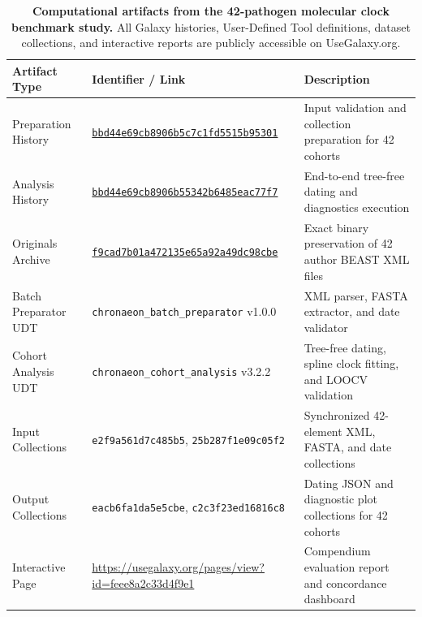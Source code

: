 \documentclass[11pt,letterpaper]{article}
\begin{document}
\begin{table}[!htbp]
\centering
\small
\begin{tabularx}{\textwidth}{llX}
\toprule
\textbf{Artifact Type} & \textbf{Identifier / Link} & \textbf{Description} \\
\midrule
Preparation History & \href{https://usegalaxy.org/histories/view?id=bbd44e69cb8906b5c7c1fd5515b95301}{\texttt{bbd44e69cb8906b5c7c1fd5515b95301}} & Input validation and collection preparation for 42 cohorts \\
Analysis History & \href{https://usegalaxy.org/histories/view?id=bbd44e69cb8906b55342b6485eac77f7}{\texttt{bbd44e69cb8906b55342b6485eac77f7}} & End-to-end tree-free dating and diagnostics execution \\
Originals Archive & \href{https://usegalaxy.org/datasets/f9cad7b01a472135e65a92a49dc98cbe}{\texttt{f9cad7b01a472135e65a92a49dc98cbe}} & Exact binary preservation of 42 author BEAST XML files \\
Batch Preparator UDT & \texttt{chronaeon\_batch\_preparator} v1.0.0 & XML parser, FASTA extractor, and date validator \\
Cohort Analysis UDT & \texttt{chronaeon\_cohort\_analysis} v3.2.2 & Tree-free dating, spline clock fitting, and LOOCV validation \\
Input Collections & \texttt{e2f9a561d7c485b5}, \texttt{25b287f1e09c05f2} & Synchronized 42-element XML, FASTA, and date collections \\
Output Collections & \texttt{eacb6fa1da5e5cbe}, \texttt{c2c3f23ed16816c8} & Dating JSON and diagnostic plot collections for 42 cohorts \\
Interactive Page & \url{https://usegalaxy.org/pages/view?id=feee8a2c33d4f9e1} & Compendium evaluation report and concordance dashboard \\
\bottomrule
\end{tabularx}
\caption{\textbf{Computational artifacts from the 42-pathogen molecular clock benchmark study.} All Galaxy histories, User-Defined Tool definitions, dataset collections, and interactive reports are publicly accessible on UseGalaxy.org.}
\label{tab:case3_artifacts}
\end{table}
\end{document}
